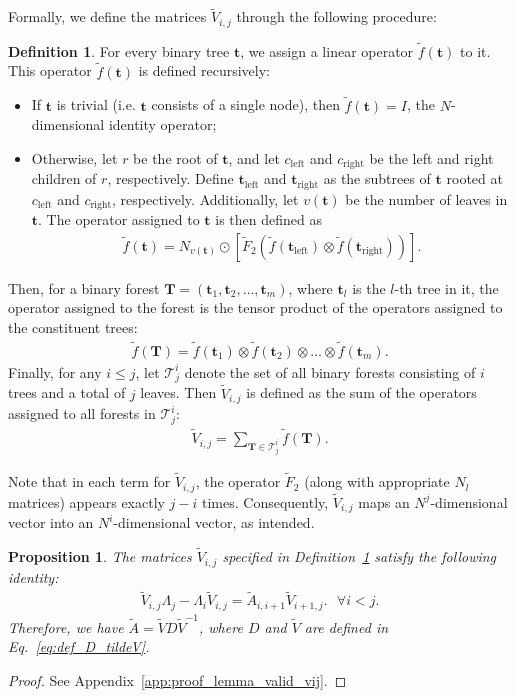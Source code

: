 \documentclass[superscriptaddress,onecolumn,nofootinbib,longbibliography,a4paper,accepted=2026-09-29]{quantumarticle}
\theoremstyle{plain}
\newtheorem{prop}[thm]{Proposition}
\theoremstyle{definition}
\newtheorem{definition}[thm]{Definition}
\numberwithin{thm}{section}
\numberwithin{assumption}{section}
\numberwithin{lemma}{section}
\numberwithin{prop}{section}
\numberwithin{cor}{section}
\numberwithin{definition}{section}
\numberwithin{rmk}{section}
\numberwithin{equation}{section}
\newcommand{\lrb}[1]{\left ( #1 \right )}
\newcommand{\lrsb}[1]{\left [ #1 \right ]}
\newcommand{\mbt}{\mathbf{t}}
\newcommand{\mbf}{\mathbf{T}}
\begin{document}
Formally, we define the matrices $\tilde{V}_{i,j}$ through the following procedure:
\begin{definition}
For every binary tree $\mbt$, we assign a linear operator $\tilde{f}(\mbt)$ to it. This operator $\tilde{f}(\mbt)$ is defined recursively: 
\begin{itemize}
    \item If $\mbt$ is trivial (i.e. $\mbt$ consists of a single node), then $\tilde{f}(\mbt)=I$, the $N$-dimensional identity operator;
    \item Otherwise, let $r$ be the root of $\mbt$, and let $c_{\mathrm{left}}$ and $c_{\mathrm{right}}$ be the left and right children of $r$, respectively. Define $\mbt_{\mathrm{left}}$ and $\mbt_{\mathrm{right}}$ as the subtrees of $\mbt$ rooted at $c_{\mathrm{left}}$ and $c_{\mathrm{right}}$, respectively. Additionally, let $v(\mbt)$ be the number of leaves in $\mbt$. The operator assigned to $\mbt$ is then defined as
    \begin{align}
        \tilde{f}(\mbt)=N_{v(\mbt)} \odot \lrsb{\tilde{F}_2\lrb{\tilde{f}(\mbt_{\mathrm{left}}) \otimes \tilde{f}(\mbt_{\mathrm{right}})}}.        
    \end{align}
\end{itemize}
Then, for a binary forest $\mbf=(\mbt_1,\mbt_2,\dots,\mbt_m)$, where $\mbt_l$ is the $l$-th tree in it, the operator assigned to the forest is the tensor product of the operators assigned to the constituent trees:
\begin{align}
    \tilde{f}(\mbf)=\tilde{f}(\mbt_1) \otimes \tilde{f}(\mbt_2) \otimes \dots \otimes \tilde{f}(\mbt_m).
\end{align}
Finally, for any $i \le j$,  let $\mathcal{T}^i_j$ denote the set of all binary forests consisting of $i$ trees and a total of $j$ leaves. Then $\tilde{V}_{i,j}$ is defined as the sum of the operators assigned to all forests in $\mathcal{T}^i_j$:
\begin{align}
\tilde{V}_{i,j}=\sum_{\mbf \in \mathcal{T}^i_j} \tilde{f}(\mbf).
\end{align}
\label{def:vij_expression}
\end{definition}

Note that in each term for $\tilde{V}_{i,j}$, the operator $\tilde{F}_2$ (along with appropriate $N_l$ matrices) appears exactly $j-i$ times. Consequently, $\tilde{V}_{i,j}$ maps an $N^j$-dimensional vector into an $N^i$-dimensional vector, as intended.

\begin{prop}
The matrices $\tilde{V}_{i,j}$ specified in Definition~\ref{def:vij_expression} satisfy the following identity:
\begin{align}
\tilde{V}_{i,j}\Lambda_j-\Lambda_i \tilde{V}_{i,j} = \tilde{A}_{i,i+1} \tilde{V}_{i+1,j}.    ~~~\forall i<j.
\end{align}
\label{prop:valid_vij}
Therefore, we have $\tilde{A}=\tilde{V} D \tilde{V}^{-1}$, where $D$ and $\tilde{V}$ are defined in Eq.~\eqref{eq:def_D_tildeV}.
\end{prop}
\begin{proof}
See Appendix~\ref{app:proof_lemma_valid_vij}.
\end{proof}
\end{document}
